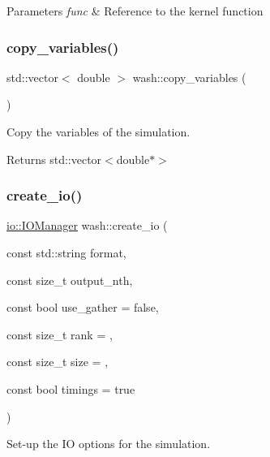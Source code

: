 \begin{DoxyParams}{Parameters}
{\em func} & Reference to the kernel function \\
\hline
\end{DoxyParams}
\mbox{\label{namespacewash_afb1cc65bb4ecf6112723b4fb95450c96}} 
\subsubsection{\texorpdfstring{copy\+\_\+variables()}{copy\_variables()}}
{\footnotesize\ttfamily std\+::vector$<$ double $>$ wash\+::copy\+\_\+variables (\begin{DoxyParamCaption}{ }\end{DoxyParamCaption})}



Copy the variables of the simulation. 

\begin{DoxyReturn}{Returns}
std\+::vector$<$double$\ast$$>$ 
\end{DoxyReturn}
\mbox{\label{namespacewash_a92e4e768dbd609eba32fc0d68977d42f}} 
\subsubsection{\texorpdfstring{create\+\_\+io()}{create\_io()}}
{\footnotesize\ttfamily \mbox{\hyperlink{classwash_1_1io_1_1IOManager}{io\+::\+I\+O\+Manager}} wash\+::create\+\_\+io (\begin{DoxyParamCaption}\item[{const std\+::string}]{format,  }\item[{const size\+\_\+t}]{output\+\_\+nth,  }\item[{const bool}]{use\+\_\+gather = {\ttfamily false},  }\item[{const size\+\_\+t}]{rank = {},  }\item[{const size\+\_\+t}]{size = {},  }\item[{const bool}]{timings = {\ttfamily true} }\end{DoxyParamCaption})}



Set-\/up the IO options for the simulation. 


